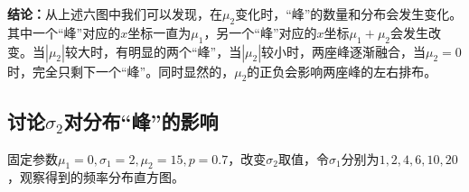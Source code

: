 \documentclass[CJK]{ctexart}
\begin{document}
\textbf{结论：}从上述六图中我们可以发现，在$\mu_2$变化时，“峰”的数量和分布会发生变化。其中一个“峰”对应的$x$坐标一直为$\mu_1$，另一个“峰”对应的$x$坐标$\mu_1+\mu_2$会发生改变。当$|\mu_2|$较大时，有明显的两个“峰”，当$|\mu_2|$较小时，两座峰逐渐融合，当$\mu_2=0$时，完全只剩下一个“峰”。同时显然的，$\mu_2$的正负会影响两座峰的左右排布。

\subsection{讨论$\sigma_2$对分布“峰”的影响}

固定参数$\mu_1=0,\sigma_1=2,\mu_2=15,p=0.7$，改变$\sigma_2$取值，令$\sigma_1$分别为$1,2,4,6,10,20$，观察得到的频率分布直方图。

\begin{figure}[H]
    \centering
    \quad
    \quad
    \quad
\end{figure}
\end{document}
